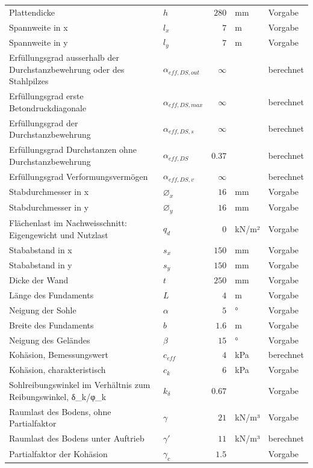 \documentclass[11pt,a4paper]{article}
\begin{document}
\begin{xltabular}{\linewidth}{>{\raggedright\arraybackslash}Xlrll}
Plattendicke & $h$ & $280$ & mm & Vorgabe \\
Spannweite in x & $l_x$ & $7$ & m & Vorgabe \\
Spannweite in y & $l_y$ & $7$ & m & Vorgabe \\
Erfüllungsgrad ausserhalb der Durchstanzbewehrung oder des Stahlpilzes & $\alpha_{eff,DS,out}$ & $\infty$ &  & berechnet \\
Erfüllungsgrad erste Betondruckdiagonale & $\alpha_{eff,DS,max}$ & $\infty$ &  & berechnet \\
Erfüllungsgrad der Durchstanzbewehrung & $\alpha_{eff,DS,s}$ & $\infty$ &  & berechnet \\
Erfüllungsgrad Durchstanzen ohne Durchstanzbewehrung & $\alpha_{eff,DS}$ & $0.37$ &  & berechnet \\
Erfüllungsgrad Verformungsvermögen & $\alpha_{eff,DS,v}$ & $\infty$ &  & berechnet \\
Stabdurchmesser in x & $\varnothing_x$ & $16$ & mm & Vorgabe \\
Stabdurchmesser in y & $\varnothing_y$ & $16$ & mm & Vorgabe \\
Flächenlast im Nachweisschnitt: Eigengewicht und Nutzlast & $q_d$ & $0$ & kN/m² & Vorgabe \\
Stababstand in x & $s_x$ & $150$ & mm & Vorgabe \\
Stababstand in y & $s_y$ & $150$ & mm & Vorgabe \\
Dicke der Wand & $t$ & $250$ & mm & Vorgabe \\
Länge des Fundaments & $L$ & $4$ & m & Vorgabe \\
Neigung der Sohle & $\alpha$ & $5$ & ° & Vorgabe \\
Breite des Fundaments & $b$ & $1.6$ & m & Vorgabe \\
Neigung des Geländes & $\beta$ & $15$ & ° & Vorgabe \\
Kohäsion, Bemessungswert & $c_{eff}$ & $4$ & kPa & berechnet \\
Kohäsion, charakteristisch & $c_k$ & $6$ & kPa & Vorgabe \\
Sohlreibungswinkel im Verhältnis zum Reibungswinkel, δ\_k/φ\_k & $k_{\delta}$ & $0.67$ &  & Vorgabe \\
Raumlast des Bodens, ohne Partialfaktor & $\gamma$ & $21$ & kN/m³ & Vorgabe \\
Raumlast des Bodens unter Auftrieb & $\gamma'$ & $11$ & kN/m³ & berechnet \\
Partialfaktor der Kohäsion & $\gamma_c$ & $1.5$ &  & Vorgabe \\

\end{xltabular}
\end{document}
